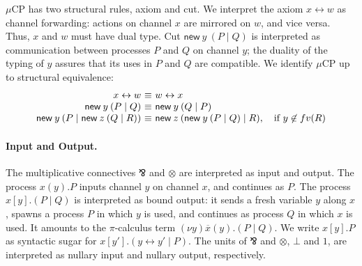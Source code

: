 \documentclass[orivec,envcountsame]{llncs}
\makeatletter
\newcommand{\parr}{\mathbin\bindnasrepma}
\newcommand{\cpdual}[1]{#1^\perp}
\newcommand{\mkwd}[1]{\mathsf{#1}}
\newcommand{\link}[2]{#1 \leftrightarrow #2}
\newcommand{\cut}[4]{\mkwd{new}\:#1 \: (#3 \mid #4)}
\newcommand{\mucp}{$\mu\mathrm{CP}$\xspace}
\newcommand{\ba}{\begin{array}}
\newcommand{\ea}{\end{array}}
\newenvironment{equations}{\[\ba{@{}r@{~}c@{~}l@{}}}{\ea\]}
\makeatother
\begin{document}
\mucp has two structural rules, axiom and cut. We interpret the axiom $\link{x}{w}$ as channel
forwarding: actions on channel $x$ are mirrored on $w$, and vice versa. Thus, $x$ and $w$ must have
dual type. Cut $\cut{y}{A}{P}{Q}$ is interpreted as communication between processes $P$ and $Q$ on
channel $y$; the duality of the typing of $y$ assures that its uses in $P$ and $Q$ are
compatible. We identify \mucp up to structural equivalence:
%
\small\begin{equations}
  \link{x}{w} &\equiv& \link{w}{x} \\
  \cut{y}{A}{P}{Q} &\equiv& \cut{y}{\cpdual{A}}{Q}{P} \\
  \cut{y}{A}{P}{\cut{z}{B}{Q}{R}} &\equiv& \cut{z}{B}{\cut{y}{A}{P}{Q}}{R}, \quad \text{if $y \not\in fv(R)$} \\
\end{equations}\normalsize%


\paragraph{Input and Output.}

The multiplicative connectives $\parr$ and $\otimes$ are interpreted as input and output. The
process $x(y).P$ inputs channel $y$ on channel $x$, and continues as $P$. The process $x[y].(P \mid
Q)$ is interpreted as bound output: it sends a fresh variable $y$ along $x$, spawns a process $P$ in
which $y$ is used, and continues as process $Q$ in which $x$ is used.  It amounts to the
$\pi$-calculus term $(\nu y) \overline{x}(y).(P \mid Q)$. We write $x[y].P$ as syntactic sugar for
$x[y'].(\link{y}{y'} \mid P)$. The units of $\parr$ and $\otimes$, $\bot$ and $1$, are interpreted
as nullary input and nullary output, respectively.
\end{document}
